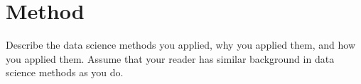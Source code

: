 \section{Method}
\label{sec:method}
Describe the data science methods you applied, why you applied them, and how you applied them. Assume that your reader has similar background in data science methods as you do.

